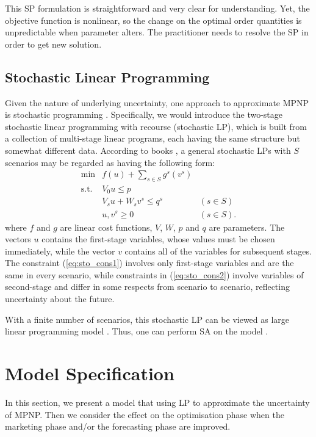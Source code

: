 \documentclass[a4paper,11pt]{article}
\begin{document}
This SP formulation is straightforward and very clear for understanding. Yet, the objective function is nonlinear, so the change on the optimal order quantities is unpredictable when parameter alters. The practitioner needs to resolve the SP in order to get new solution. 

\subsection{Stochastic Linear Programming}
Given the nature of underlying uncertainty, one approach to approximate MPNP is stochastic programming \cite{Bea55,D98}. Specifically, we would introduce the two-stage stochastic linear programming with recourse (stochastic LP), which is built from a collection of multi-stage linear programs, each having the same structure but somewhat different data. According to books \cite{HS13,KM76,KWK94,Pf12}, a general stochastic LPs with $S$ scenarios may be regarded as having the following form:
\begin{eqnarray}
    \min	& f ( u ) + \sum_{s \in S} g^s ( v^s )\\
\label{eq:sto_cons1}
	\text{s.t.}    & V_0 u \leq p\\
\label{eq:sto_cons2}
	& V_s u +W_s v^s \leq q^s & (s \in S)\\
	& u, v^s \geq 0 & (s \in S).
\end{eqnarray}
where $f$ and $g$ are linear cost functions, $V$, $W$, $p$ and $q$ are parameters. The vectors $u$ contains the first-stage variables, whose values must be chosen immediately, while the vector $v$ contains all of the variables for subsequent stages. The constraint (\ref{eq:sto_cons1}) involves only first-stage variables and are the same in every scenario, while constraints in (\ref{eq:sto_cons2}) involve variables of second-stage and differ in some respects from scenario to scenario, reflecting uncertainty about the future.

With a finite number of scenarios, this stochastic LP can be viewed as large linear programming model \cite{KW12}. Thus, one can perform SA on the model \cite{AW93,Du95}. 

\section{Model Specification}
\label{se:model}

In this section, we present a model that using LP to approximate the uncertainty of MPNP. Then we consider the effect on the optimisation phase when the marketing phase and/or the forecasting phase are improved.
\end{document}
